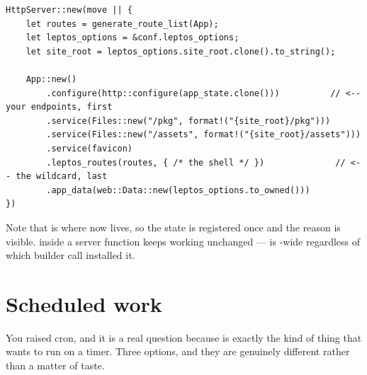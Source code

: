\begin{lstlisting}[style=rs,caption={\file{src/main.rs} then reads as a list of decisions, not a wall.}]
HttpServer::new(move || {
    let routes = generate_route_list(App);
    let leptos_options = &conf.leptos_options;
    let site_root = leptos_options.site_root.clone().to_string();

    App::new()
        .configure(http::configure(app_state.clone()))          // <-- your endpoints, first
        .service(Files::new("/pkg", format!("{site_root}/pkg")))
        .service(Files::new("/assets", format!("{site_root}/assets")))
        .service(favicon)
        .leptos_routes(routes, { /* the shell */ })              // <-- the wildcard, last
        .app_data(web::Data::new(leptos_options.to_owned()))
})
\end{lstlisting}

\begin{pattern}
Note that  is where  now lives, so the state is registered
once and the reason is visible.  inside a server
function keeps working unchanged ---  is -wide regardless of which builder
call installed it.
\end{pattern}

\section{Scheduled work}

You raised cron, and it is a real question because  is exactly
the kind of thing that wants to run on a timer. Three options, and they are genuinely different
rather than a matter of taste.

